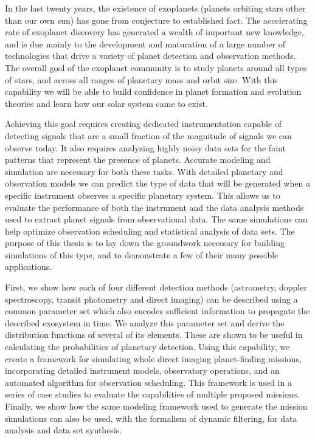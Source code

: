 In the last twenty years, the existence of exoplanets (planets orbiting stars other than our own sun) has gone from conjecture to established fact.  The accelerating rate of exoplanet discovery has generated a wealth of important new knowledge, and is due mainly to the development and maturation of a large number of technologies that drive a variety of planet detection and observation methods.  The overall goal of the exoplanet community is to study planets around all types of stars, and across all ranges of planetary mass and orbit size.  With this capability we will be able to build confidence in planet formation and evolution theories and learn how our solar system came to exist.

Achieving this goal requires creating dedicated instrumentation capable of detecting signals that are a small fraction of the magnitude of signals we can observe today.  It also requires analyzing highly noisy data sets for the faint patterns that represent the presence of planets.  Accurate modeling and simulation are necessary for both these tasks.  With detailed planetary and observation models we can predict the type of data that will be generated when a specific instrument observes a specific planetary system.  This allows us to evaluate the performance of both the instrument and the data analysis methods used to extract planet signals from observational data.  The same simulations can help optimize observation scheduling and statistical analysis of data sets.  The purpose of this thesis is to lay down the groundwork necessary for building simulations of this type, and to demonstrate a few of their many possible applications.

First, we show how each of four different detection methods (astrometry, doppler spectroscopy, transit photometry and direct imaging) can be described using a common parameter set which also encodes sufficient information to propagate the described exosystem in time.  We analyze this parameter set and derive the distribution functions of several of its elements.  These are shown to be useful in calculating the probabilities of planetary detection.  Using this capability, we create a framework for simulating whole direct imaging planet-finding missions, incorporating detailed instrument models, observatory operations, and an automated algorithm for observation scheduling.  This framework is used in a series of case studies to evaluate the capabilities of multiple proposed missions.  Finally, we show how the same modeling framework used to generate the mission simulations can also be used, with the formalism of dynamic filtering, for data analysis and data set synthesis.